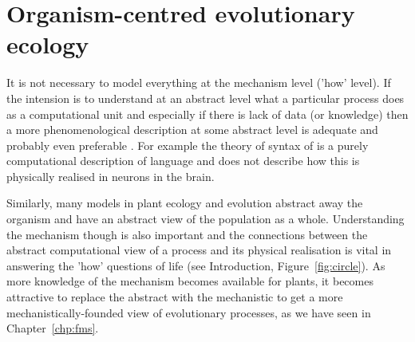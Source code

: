 \documentclass[phd]{infthesis}
\begin{document}







\section{Organism-centred evolutionary ecology}
It is not necessary to model everything at the mechanism level ('how' level). If
the intension is to understand at an abstract level what a particular process
does as a computational unit and especially if there is lack of data (or
knowledge) then a more phenomenological description at some abstract level is
adequate and probably even preferable \citep[see levels of description of
Marr;][Chapter 1]{marr_vision:_1982}. For example the theory of syntax of
\citet{chomsky_aspects_2014} is a purely computational description of language
and does not describe how this is physically realised in neurons in the brain.

Similarly, many models in plant ecology and evolution abstract away the organism
and have an abstract view of the population as a whole. Understanding the
mechanism though is also important and the connections between the abstract
computational view of a process and its physical realisation is vital in
answering the 'how' questions of life (see Introduction,
Figure~\ref{fig:circle}). As more knowledge of the mechanism becomes available
for plants, it becomes attractive to replace the abstract with the mechanistic to
get a more mechanistically-founded view of evolutionary processes, as we have
seen in Chapter~\ref{chp:fms}.
\end{document}
